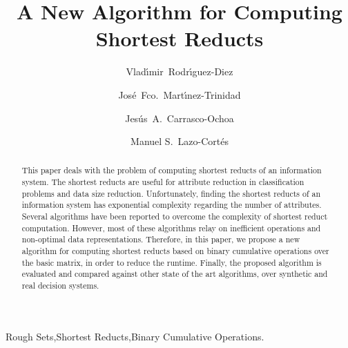 \documentclass[number,preprint,review,12pt]{elsarticle}
\begin{document}
	\title{A New Algorithm for Computing Shortest Reducts}
	
	\author[inaoe,uc]{Vlad\'{\i}mir~Rodr\'{\i}guez-Diez}
	\author[inaoe]{Jos\'{e}~Fco.~Mart\'{\i}nez-Trinidad}
	\author[inaoe]{Jes\'{u}s~A.~Carrasco-Ochoa}	
	\author[inaoe]{Manuel S.~Lazo-Cort\'{e}s}
	\address[inaoe]{Computer Science Department\\
					Instituto Nacional de Astrof\'{\i}sica, \'{O}ptica y Electr\'{o}nica\\
					Luis Enrique Erro \# 1, Santa Mar\'{\i}a Tonantzintla, Puebla, 72840, M\'{e}xico} 
	\address[uc]{Electrical Engineering Department\\
				 Universidad de Camag\"{u}ey\\
				 Circv. Nte. km 5$\frac{1}{2}$, Camag\"{u}ey, Cuba}
	
	\begin{abstract}
		This paper deals with the problem of computing shortest reducts of an information system. The shortest reducts are useful for attribute reduction in classification problems and data size reduction. Unfortunately, finding the shortest reducts of an information system has exponential complexity regarding the number of attributes. Several algorithms have been reported to overcome the complexity of shortest reduct computation. However, most of these algorithms relay on inefficient operations and non-optimal data representations. Therefore, in this paper, we propose a new algorithm for computing shortest reducts based on binary cumulative operations over the basic matrix, in order to reduce the runtime. Finally, the proposed algorithm is evaluated and compared against other state of the art algorithms, over synthetic and real decision systems.
	\end{abstract}
	
	\begin{keyword}
		Rough Sets\sep Shortest Reducts\sep Binary Cumulative Operations.
	\end{keyword}

	\maketitle

\end{document}
